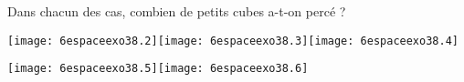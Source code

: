 Dans chacun des cas, combien de petits cubes a-t-on percé ?
\par
\texttt{[image: 6espaceexo38.2]}\hfill\texttt{[image: 6espaceexo38.3]}\hfill\texttt{[image: 6espaceexo38.4]}
\par\texttt{[image: 6espaceexo38.5]}\hfill\texttt{[image: 6espaceexo38.6]}